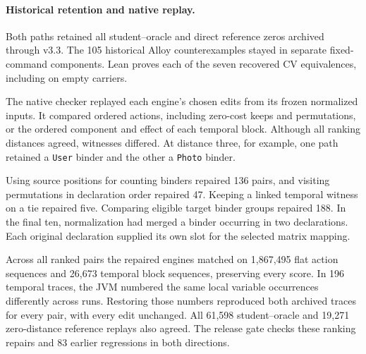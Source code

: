 \paragraph{Historical retention and native replay.}
Both paths retained all \histPublishedPaired{} student--oracle and
\histPublishedRefs{} direct reference zeros archived through v3.3.
The 105 historical Alloy counterexamples stayed in separate fixed-command
components. Lean proves each of the seven recovered CV equivalences,
including on empty carriers.

The native checker replayed each engine's chosen edits from its frozen
normalized inputs. It compared ordered actions, including zero-cost keeps
and permutations, or the ordered component and effect of each temporal
block. Although all ranking distances agreed, \replayOriginalFailures{}
witnesses differed. At distance three, for example, one path retained a
\texttt{User} binder and the other a \texttt{Photo} binder.

Using source positions for counting binders repaired 136 pairs, and visiting
permutations in declaration order repaired 47. Keeping a linked temporal
witness on a tie repaired five. Comparing eligible target binder groups
repaired 188. In the final ten, normalization had merged a binder occurring
in two declarations. Each original declaration supplied its own slot for
the selected matrix mapping.

Across all \replayPairs{} ranked pairs the repaired engines matched on
1,867,495 flat action sequences and 26,673 temporal block sequences,
preserving every score. In 196 temporal traces, the JVM numbered the same
local variable occurrences differently across runs. Restoring those numbers
reproduced both archived traces for every pair, with every edit unchanged.
All 61,598 student--oracle and 19,271 zero-distance reference replays also
agreed. The release gate checks these \replayOriginalFailures{} ranking
repairs and 83 earlier regressions in both directions.
